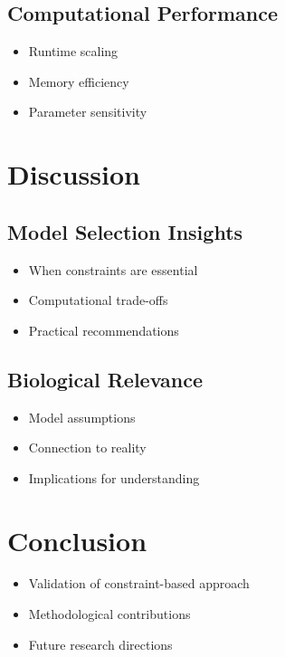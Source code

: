 \documentclass[conference]{IEEEtran}
\begin{document}
\subsection{Computational Performance}
\begin{itemize}
    \item Runtime scaling
    \item Memory efficiency
    \item Parameter sensitivity
\end{itemize}

\section{Discussion}
\subsection{Model Selection Insights}
\begin{itemize}
    \item When constraints are essential
    \item Computational trade-offs
    \item Practical recommendations
\end{itemize}

\subsection{Biological Relevance}
\begin{itemize}
    \item Model assumptions
    \item Connection to reality
    \item Implications for understanding
\end{itemize}

\section{Conclusion}
\begin{itemize}
    \item Validation of constraint-based approach
    \item Methodological contributions
    \item Future research directions
\end{itemize}



\end{document}
